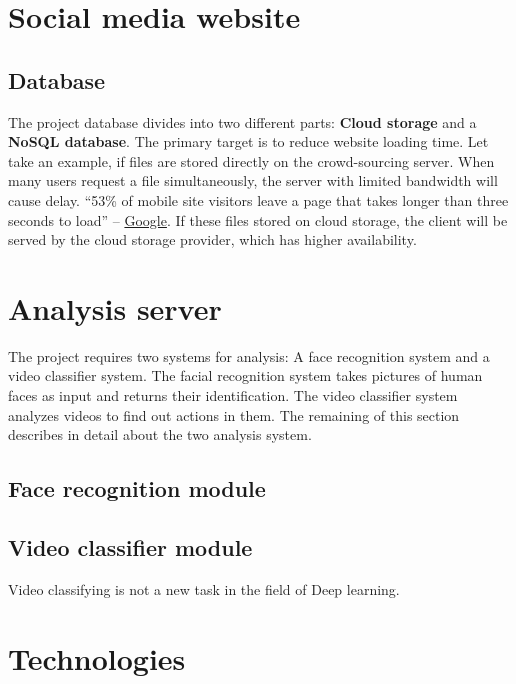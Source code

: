 \section{Social media website}

\subsection{Database}
The project database divides into two different parts: \textbf{Cloud storage} and a \textbf{NoSQL database}. The primary target is to reduce website loading time. Let take an example, if files are stored directly on the crowd-sourcing server. When many users request a file simultaneously, the server with limited bandwidth will cause delay. “53\% of mobile site visitors leave a page that takes longer than three seconds to load” – \href{https://think.storage.googleapis.com/docs/mobile-page-speed-new-industry-benchmarks.pdf}{Google}. If these files stored on cloud storage, the client will be served by the cloud storage provider, which has higher availability.
\section{Analysis server}
The project requires two systems for analysis: A face recognition system and a video classifier system. The facial recognition system takes pictures of human faces as input and returns their identification. The video classifier system analyzes videos to find out actions in them. The remaining of this section describes in detail about the two analysis system.
\subsection{Face recognition module}
\subsection{Video classifier module}
Video classifying is not a new task in the field of Deep learning.
	
\section{Technologies}
